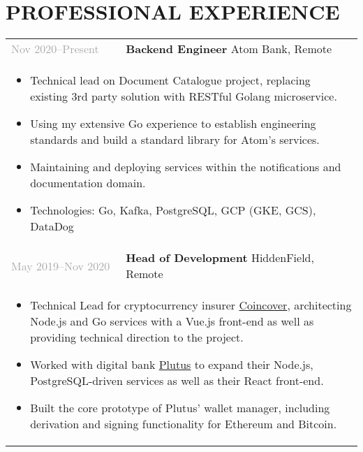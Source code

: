 \documentclass{article}
\newenvironment{exptable}{
  \begin{longtable}{lp{0.8\textwidth}}
  }{
  \end{longtable}
}
\begin{document}
  \section*{PROFESSIONAL EXPERIENCE}
    \begin{exptable}
      \textcolor{darkgray}{Nov 2020--Present}  & \textbf{Backend Engineer} Atom Bank, Remote \\
      \multicolumn{2}{p{\textwidth}}{
        \begin{itemize}
          \item Technical lead on Document Catalogue project, replacing existing 3rd party solution with RESTful Golang microservice.
          \item Using my extensive Go experience to establish engineering standards and build a standard library for Atom's services.
          \item Maintaining and deploying services within the notifications and documentation domain.
        \end{itemize}

        \vspace{1em}

        \begin{itemize}[leftmargin=1em]
          \item[] Technologies: Go, Kafka, PostgreSQL, GCP (GKE, GCS), DataDog
        \end{itemize}
      } \\

      \textcolor{darkgray}{May 2019--Nov 2020}  & \textbf{Head of Development} HiddenField, Remote \\
      \multicolumn{2}{p{\textwidth}}{
        \begin{itemize}
          \item Technical Lead for cryptocurrency insurer \href{https://www.coincover.com}{Coincover}, architecting Node.js and Go services with a Vue.js front-end as well as providing technical direction to the project.
          \item Worked with digital bank \href{https://plutus.it}{Plutus} to expand their Node.js, PostgreSQL-driven services as well as their React front-end.
          \item Built the core prototype of Plutus' wallet manager, including derivation and signing functionality for Ethereum and Bitcoin.
        \end{itemize}

        \vspace{1em}

}
\end{exptable}
\end{document}
